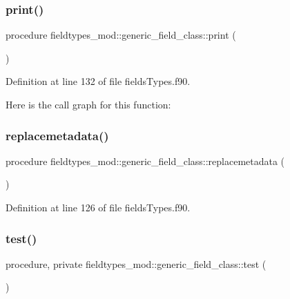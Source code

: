 \subsubsection{\texorpdfstring{print()}{print()}}
{\footnotesize\ttfamily procedure fieldtypes\+\_\+mod\+::generic\+\_\+field\+\_\+class\+::print (\begin{DoxyParamCaption}{ }\end{DoxyParamCaption})\hspace{0.3cm}{\ttfamily [private]}}



Definition at line 132 of file fields\+Types.\+f90.

Here is the call graph for this function\+:
\mbox{\label{structfieldtypes__mod_1_1generic__field__class_a040a6a67e64938b6ce249dd6a584584f}} 
\subsubsection{\texorpdfstring{replacemetadata()}{replacemetadata()}}
{\footnotesize\ttfamily procedure fieldtypes\+\_\+mod\+::generic\+\_\+field\+\_\+class\+::replacemetadata (\begin{DoxyParamCaption}{ }\end{DoxyParamCaption})\hspace{0.3cm}{\ttfamily [private]}}



Definition at line 126 of file fields\+Types.\+f90.

\mbox{\label{structfieldtypes__mod_1_1generic__field__class_a884e1d0b4152f873edc421ee4079aafb}} 
\subsubsection{\texorpdfstring{test()}{test()}}
{\footnotesize\ttfamily procedure, private fieldtypes\+\_\+mod\+::generic\+\_\+field\+\_\+class\+::test (\begin{DoxyParamCaption}{ }\end{DoxyParamCaption})\hspace{0.3cm}{\ttfamily [private]}}



